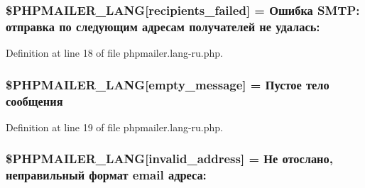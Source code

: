 \subsubsection[{\texorpdfstring{\$\+P\+H\+P\+M\+A\+I\+L\+E\+R\+\_\+\+L\+A\+NG}{$PHPMAILER_LANG}}]{\setlength{\rightskip}{0pt plus 5cm}\$P\+H\+P\+M\+A\+I\+L\+E\+R\+\_\+\+L\+A\+NG\mbox{[}\textquotesingle{}recipients\+\_\+failed\textquotesingle{}\mbox{]} = \textquotesingle{}Ошибка S\+M\+T\+P\+: отправка по следующим адресам получателей не удалась\+: \textquotesingle{}}\hypertarget{phpmailer_8lang-ru_8php_a7589d30bb9b368327c2df015f3e6bcba}{}\label{phpmailer_8lang-ru_8php_a7589d30bb9b368327c2df015f3e6bcba}


Definition at line 18 of file phpmailer.\+lang-\/ru.\+php.

\subsubsection[{\texorpdfstring{\$\+P\+H\+P\+M\+A\+I\+L\+E\+R\+\_\+\+L\+A\+NG}{$PHPMAILER_LANG}}]{\setlength{\rightskip}{0pt plus 5cm}\$P\+H\+P\+M\+A\+I\+L\+E\+R\+\_\+\+L\+A\+NG\mbox{[}\textquotesingle{}empty\+\_\+message\textquotesingle{}\mbox{]} = \textquotesingle{}Пустое тело сообщения\textquotesingle{}}\hypertarget{phpmailer_8lang-ru_8php_a33772099f637c9d6c2cd7425e0e37fed}{}\label{phpmailer_8lang-ru_8php_a33772099f637c9d6c2cd7425e0e37fed}


Definition at line 19 of file phpmailer.\+lang-\/ru.\+php.

\subsubsection[{\texorpdfstring{\$\+P\+H\+P\+M\+A\+I\+L\+E\+R\+\_\+\+L\+A\+NG}{$PHPMAILER_LANG}}]{\setlength{\rightskip}{0pt plus 5cm}\$P\+H\+P\+M\+A\+I\+L\+E\+R\+\_\+\+L\+A\+NG\mbox{[}\textquotesingle{}invalid\+\_\+address\textquotesingle{}\mbox{]} = \textquotesingle{}Не отослано, неправильный формат {\bf email} адреса\+: \textquotesingle{}}\hypertarget{phpmailer_8lang-ru_8php_a42d61bcea4c79599ecb44fd062f54d47}{}\label{phpmailer_8lang-ru_8php_a42d61bcea4c79599ecb44fd062f54d47}


